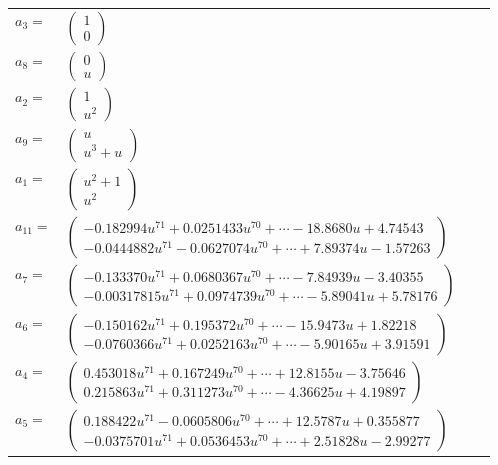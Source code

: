 \documentclass[1p]{elsarticle_modified}
\theoremstyle{definition}
\begin{document}
\begin{tabular}{m{7pt} m{180pt} m{7pt} m{180pt} }
\flushright $a_{3}=$&$\begin{pmatrix}1\\0\end{pmatrix}$ \\
\flushright $a_{8}=$&$\begin{pmatrix}0\\u\end{pmatrix}$ \\
\flushright $a_{2}=$&$\begin{pmatrix}1\\u^2\end{pmatrix}$ \\
\flushright $a_{9}=$&$\begin{pmatrix}u\\u^3+u\end{pmatrix}$ \\
\flushright $a_{1}=$&$\begin{pmatrix}u^2+1\\u^2\end{pmatrix}$ \\
\flushright $a_{11}=$&$\begin{pmatrix}-0.182994 u^{71}+0.0251433 u^{70}+\cdots-18.8680 u+4.74543\\-0.0444882 u^{71}-0.0627074 u^{70}+\cdots+7.89374 u-1.57263\end{pmatrix}$ \\
\flushright $a_{7}=$&$\begin{pmatrix}-0.133370 u^{71}+0.0680367 u^{70}+\cdots-7.84939 u-3.40355\\-0.00317815 u^{71}+0.0974739 u^{70}+\cdots-5.89041 u+5.78176\end{pmatrix}$ \\
\flushright $a_{6}=$&$\begin{pmatrix}-0.150162 u^{71}+0.195372 u^{70}+\cdots-15.9473 u+1.82218\\-0.0760366 u^{71}+0.0252163 u^{70}+\cdots-5.90165 u+3.91591\end{pmatrix}$ \\
\flushright $a_{4}=$&$\begin{pmatrix}0.453018 u^{71}+0.167249 u^{70}+\cdots+12.8155 u-3.75646\\0.215863 u^{71}+0.311273 u^{70}+\cdots-4.36625 u+4.19897\end{pmatrix}$ \\
\flushright $a_{5}=$&$\begin{pmatrix}0.188422 u^{71}-0.0605806 u^{70}+\cdots+12.5787 u+0.355877\\-0.0375701 u^{71}+0.0536453 u^{70}+\cdots+2.51828 u-2.99277\end{pmatrix}$ \\

\end{tabular}
\end{document}
